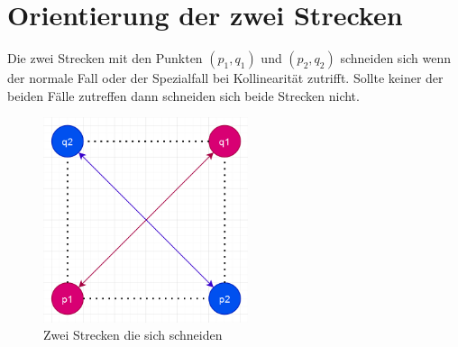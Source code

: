 \documentclass[conference]{IEEEtran}
\begin{document}
\section{Orientierung der zwei Strecken}
Die zwei Strecken mit den Punkten $(p_1,q_1)$ und $(p_2,q_2)$ schneiden sich wenn der normale Fall oder der Spezialfall bei Kollinearität zutrifft. Sollte keiner der beiden Fälle zutreffen dann schneiden sich beide Strecken nicht.\\
\begin{figure}[h]
	\begin{center}
		\includegraphics[width=6cm]{Intersection.png}
		\caption{Zwei Strecken die sich schneiden}
		\label{figure_3}
	\end{center}
\end{figure}\\
\end{document}
